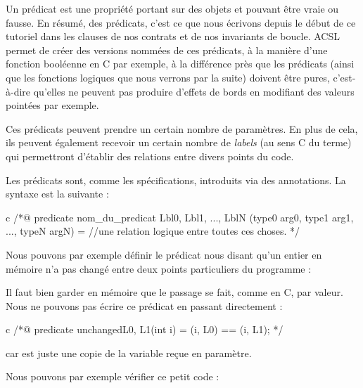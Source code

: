 Un prédicat est une propriété portant sur des objets et pouvant être vraie ou
fausse. En résumé, des prédicats, c'est ce que nous écrivons depuis le début de
ce tutoriel dans les clauses de nos contrats et de nos invariants de boucle.
ACSL permet de créer des versions nommées de ces prédicats, à la manière
d'une fonction booléenne en C par exemple, à la différence près que
les prédicats (ainsi que les fonctions logiques que nous verrons par la suite)
doivent être pures, c'est-à-dire qu'elles ne peuvent pas produire d'effets de
bords en modifiant des valeurs pointées par exemple.



Ces prédicats peuvent prendre un certain nombre de paramètres. En plus de cela,
ils peuvent également recevoir un certain nombre de \textit{labels} (au sens C du terme)
qui permettront d'établir des relations entre divers points du code.





Les prédicats sont, comme les spécifications, introduits via des
annotations. La syntaxe est la suivante :



\begin{CodeBlock}{c}
  /*@
  predicate nom_du_predicat { Lbl0, Lbl1, ..., LblN }(type0 arg0, type1 arg1, ..., typeN argN) =
  //une relation logique entre toutes ces choses.
  */
\end{CodeBlock}



Nous pouvons par exemple définir le prédicat nous disant qu'un entier en mémoire n'a
pas changé entre deux points particuliers du programme :




\begin{Warning}
  Il faut bien garder en mémoire que le passage se fait, comme en C, par valeur.
  Nous ne pouvons pas écrire ce prédicat en passant directement  :

  \begin{CodeBlock}{c}
    /*@
    predicate unchanged{L0, L1}(int i) =
    \at(i, L0) == \at(i, L1);
    */
  \end{CodeBlock}

  car  est juste une copie de la variable reçue en paramètre.
\end{Warning}


Nous pouvons par exemple vérifier ce petit code :


